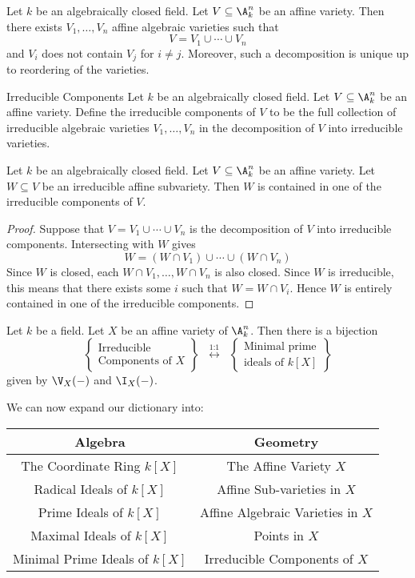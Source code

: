 \documentclass[a4paper]{article}
\begin{document}
\begin{prp}{}{} Let $k$ be an algebraically closed field. Let $V\subseteq\A_k^n$ be an affine variety. Then there exists $V_1,\dots,V_n$ affine algebraic varieties such that $$V=V_1\cup\cdots\cup V_n$$ and $V_i$ does not contain $V_j$ for $i\neq j$. Moreover, such a decomposition is unique up to reordering of the varieties. 
\end{prp}

\begin{defn}{Irreducible Components}{} Let $k$ be an algebraically closed field. Let $V\subseteq\A_k^n$ be an affine variety. Define the irreducible components of $V$ to be the full collection of irreducible algebraic varieties $V_1,\dots,V_n$ in the decomposition of $V$ into irreducible varieties. 
\end{defn}

\begin{lmm}{}{} Let $k$ be an algebraically closed field. Let $V\subseteq\A_k^n$ be an affine variety. Let $W\subseteq V$ be an irreducible affine subvariety. Then $W$ is contained in one of the irreducible components of $V$. \tcbline
\begin{proof}
Suppose that $V=V_1\cup\cdots\cup V_n$ is the decomposition of $V$ into irreducible components. Intersecting with $W$ gives $$W=(W\cap V_1)\cup\cdots\cup(W\cap V_n)$$ Since $W$ is closed, each $W\cap V_1,\dots,W\cap V_n$ is also closed. Since $W$ is irreducible, this means that there exists some $i$ such that $W=W\cap V_i$. Hence $W$ is entirely contained in one of the irreducible components. 
\end{proof}
\end{lmm}

\begin{lmm}{}{} Let $k$ be a field. Let $X$ be an affine variety of $\A_k^n$. Then there is a bijection $$\left\{\substack{\text{Irreducible}\\\text{Components of } X}\right\}\;\;\overset{\text{1:1}}{\longleftrightarrow}\;\;\left\{\substack{\text{Minimal prime}\\\text{ideals of }k[X]}\right\}$$ given by $\V_X(-)$ and $\I_X(-)$. 
\end{lmm}

We can now expand our dictionary into: \\
\begin{center}\begin{tabular}{c|c}
Algebra & Geometry\\
\hline
The Coordinate Ring $k[X]$ & The Affine Variety $X$\\
Radical Ideals of $k[X]$ & Affine Sub-varieties in $X$\\
Prime Ideals of $k[X]$ & Affine Algebraic Varieties in $X$\\
Maximal Ideals of $k[X]$ & Points in $X$\\
Minimal Prime Ideals of $k[X]$ & Irreducible Components of $X$
\end{tabular}\end{center}
\end{document}
